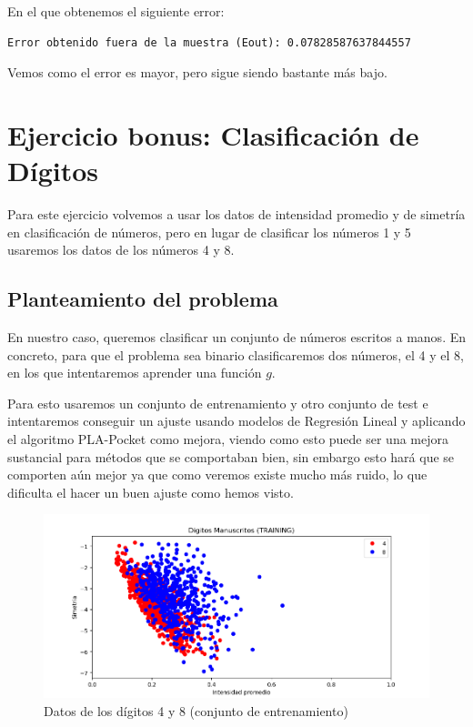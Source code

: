 \documentclass[12pt, spanish]{article}
\begin{document}
En el que obtenemos el siguiente error:

\begin{lstlisting}
Error obtenido fuera de la muestra (Eout): 0.07828587637844557
\end{lstlisting}

Vemos como el error es mayor, pero sigue siendo bastante más bajo.



\section{Ejercicio bonus: Clasificación de Dígitos}

Para este ejercicio volvemos a usar los datos de intensidad promedio y de simetría en clasificación de números, pero en lugar de clasificar los números 1 y 5 usaremos los datos de los números 4 y 8.

\subsection{Planteamiento del problema}

En nuestro caso, queremos clasificar un conjunto de números escritos a manos. En concreto, para que el problema sea binario clasificaremos dos números, el 4 y el 8, en los que intentaremos aprender una función  $g$.

Para esto usaremos un conjunto de entrenamiento y otro conjunto de test e intentaremos conseguir un ajuste usando modelos de Regresión Lineal y aplicando el algoritmo PLA-Pocket como mejora, viendo como esto puede ser una mejora sustancial para métodos que se comportaban bien, sin embargo esto hará que se comporten aún mejor ya que como veremos existe mucho más ruido, lo que dificulta el hacer un buen ajuste como hemos visto.


\begin{figure}[H]
  \centering
      \includegraphics[scale = 0.70]{datos_bonus.png}
 		 \caption{Datos de los dígitos 4 y 8 (conjunto de entrenamiento)}
  		\label{fig:bonus_entrenamiento}

\end{figure}
\end{document}
